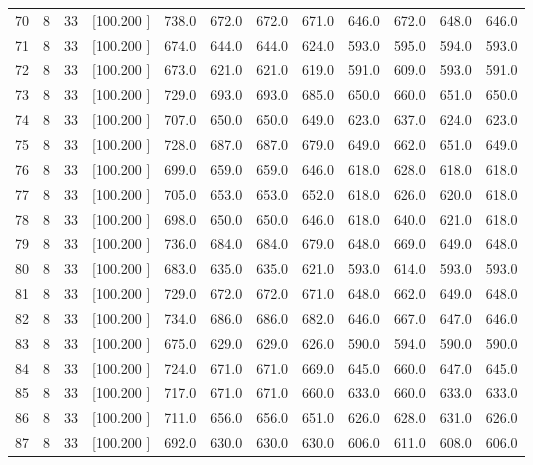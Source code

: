 \documentclass[12pt,a4paper]{article}
\begin{document}
\begin{center}
{\begin{tabular}{r r r r r r r r r r r r}
  70&  8& 33&[100.200   ]&   738.0&   672.0&   672.0&   671.0&   646.0&   672.0&   648.0&   646.0\\[-0.02in]
  71&  8& 33&[100.200   ]&   674.0&   644.0&   644.0&   624.0&   593.0&   595.0&   594.0&   593.0\\[-0.02in]
  72&  8& 33&[100.200   ]&   673.0&   621.0&   621.0&   619.0&   591.0&   609.0&   593.0&   591.0\\[-0.02in]
  73&  8& 33&[100.200   ]&   729.0&   693.0&   693.0&   685.0&   650.0&   660.0&   651.0&   650.0\\[-0.02in]
  74&  8& 33&[100.200   ]&   707.0&   650.0&   650.0&   649.0&   623.0&   637.0&   624.0&   623.0\\[-0.02in]
  75&  8& 33&[100.200   ]&   728.0&   687.0&   687.0&   679.0&   649.0&   662.0&   651.0&   649.0\\[-0.02in]
  76&  8& 33&[100.200   ]&   699.0&   659.0&   659.0&   646.0&   618.0&   628.0&   618.0&   618.0\\[-0.02in]
  77&  8& 33&[100.200   ]&   705.0&   653.0&   653.0&   652.0&   618.0&   626.0&   620.0&   618.0\\[-0.02in]
  78&  8& 33&[100.200   ]&   698.0&   650.0&   650.0&   646.0&   618.0&   640.0&   621.0&   618.0\\[-0.02in]
  79&  8& 33&[100.200   ]&   736.0&   684.0&   684.0&   679.0&   648.0&   669.0&   649.0&   648.0\\[-0.02in]
  80&  8& 33&[100.200   ]&   683.0&   635.0&   635.0&   621.0&   593.0&   614.0&   593.0&   593.0\\[-0.02in]
  81&  8& 33&[100.200   ]&   729.0&   672.0&   672.0&   671.0&   648.0&   662.0&   649.0&   648.0\\[-0.02in]
  82&  8& 33&[100.200   ]&   734.0&   686.0&   686.0&   682.0&   646.0&   667.0&   647.0&   646.0\\[-0.02in]
  83&  8& 33&[100.200   ]&   675.0&   629.0&   629.0&   626.0&   590.0&   594.0&   590.0&   590.0\\[-0.02in]
  84&  8& 33&[100.200   ]&   724.0&   671.0&   671.0&   669.0&   645.0&   660.0&   647.0&   645.0\\[-0.02in]
  85&  8& 33&[100.200   ]&   717.0&   671.0&   671.0&   660.0&   633.0&   660.0&   633.0&   633.0\\[-0.02in]
  86&  8& 33&[100.200   ]&   711.0&   656.0&   656.0&   651.0&   626.0&   628.0&   631.0&   626.0\\[-0.02in]
  87&  8& 33&[100.200   ]&   692.0&   630.0&   630.0&   630.0&   606.0&   611.0&   608.0&   606.0\\[-0.02in]

\end{tabular}}
\end{center}
\end{document}
